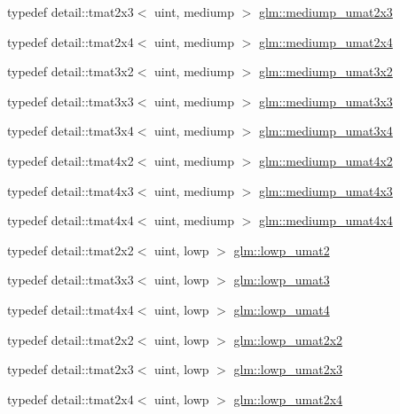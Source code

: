 \begin{DoxyCompactItemize}
\item 
typedef detail\+::tmat2x3$<$ uint, mediump $>$ \hyperlink{group__gtc__matrix__integer_gaaae45c5dbaad1ecd57bfa936d851be1b}{glm\+::mediump\+\_\+umat2x3}
\item 
typedef detail\+::tmat2x4$<$ uint, mediump $>$ \hyperlink{group__gtc__matrix__integer_gaf79e9c80f024d31f3d66ddae75e90b6c}{glm\+::mediump\+\_\+umat2x4}
\item 
typedef detail\+::tmat3x2$<$ uint, mediump $>$ \hyperlink{group__gtc__matrix__integer_ga65a9fdb1a5918fe6f308577065983e23}{glm\+::mediump\+\_\+umat3x2}
\item 
typedef detail\+::tmat3x3$<$ uint, mediump $>$ \hyperlink{group__gtc__matrix__integer_ga31a05e7b2a6a596bdc7ceeb5d9c10e1c}{glm\+::mediump\+\_\+umat3x3}
\item 
typedef detail\+::tmat3x4$<$ uint, mediump $>$ \hyperlink{group__gtc__matrix__integer_ga8113e067e1f327fac64cf9015c8c5431}{glm\+::mediump\+\_\+umat3x4}
\item 
typedef detail\+::tmat4x2$<$ uint, mediump $>$ \hyperlink{group__gtc__matrix__integer_ga8ea45737e8bc9bfae2668968056b109f}{glm\+::mediump\+\_\+umat4x2}
\item 
typedef detail\+::tmat4x3$<$ uint, mediump $>$ \hyperlink{group__gtc__matrix__integer_gaebe3b1b4b6030c096447e40fb00528f4}{glm\+::mediump\+\_\+umat4x3}
\item 
typedef detail\+::tmat4x4$<$ uint, mediump $>$ \hyperlink{group__gtc__matrix__integer_ga24b1c76fefa58f810e24cafe0ea6a6a0}{glm\+::mediump\+\_\+umat4x4}
\item 
typedef detail\+::tmat2x2$<$ uint, lowp $>$ \hyperlink{group__gtc__matrix__integer_ga09df85e6b5e53f66a86d042e0633bfbc}{glm\+::lowp\+\_\+umat2}
\item 
typedef detail\+::tmat3x3$<$ uint, lowp $>$ \hyperlink{group__gtc__matrix__integer_ga7160c0ac500826224d3baf1003c0432c}{glm\+::lowp\+\_\+umat3}
\item 
typedef detail\+::tmat4x4$<$ uint, lowp $>$ \hyperlink{group__gtc__matrix__integer_ga571dcc0328ddd1d8c54eba047b5bfa2f}{glm\+::lowp\+\_\+umat4}
\item 
typedef detail\+::tmat2x2$<$ uint, lowp $>$ \hyperlink{group__gtc__matrix__integer_gaa4dfe67706187e459004b9a6c500b048}{glm\+::lowp\+\_\+umat2x2}
\item 
typedef detail\+::tmat2x3$<$ uint, lowp $>$ \hyperlink{group__gtc__matrix__integer_ga4c8388c4a03f228c0e12dd7b7445115d}{glm\+::lowp\+\_\+umat2x3}
\item 
typedef detail\+::tmat2x4$<$ uint, lowp $>$ \hyperlink{group__gtc__matrix__integer_ga581eef861234e918e88377fd331e37e6}{glm\+::lowp\+\_\+umat2x4}

\end{DoxyCompactItemize}
